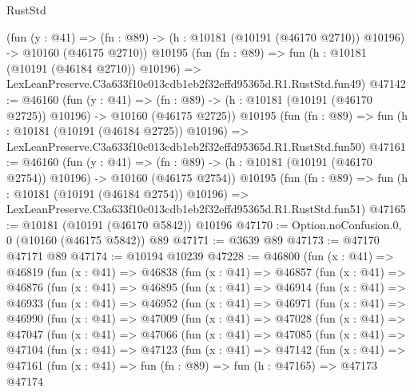 \begin{lexlean}{RustStd}
\begin{coremodule}
    (fun (y : @41) =>
    (fn : @89) -> (h : @10181 (@10191 (@46170 @2710)) @10196) -> @10160 (@46175 @2710))
    @10195
    (fun (fn : @89) =>
    fun (h : @10181 (@10191 (@46184 @2710)) @10196) =>
    LexLeanPreserve.C3a633f10c013cdb1eb2f32effd95365d.R1.RustStd.fun49)
@47142 := @46160
    (fun (y : @41) =>
    (fn : @89) -> (h : @10181 (@10191 (@46170 @2725)) @10196) -> @10160 (@46175 @2725))
    @10195
    (fun (fn : @89) =>
    fun (h : @10181 (@10191 (@46184 @2725)) @10196) =>
    LexLeanPreserve.C3a633f10c013cdb1eb2f32effd95365d.R1.RustStd.fun50)
@47161 := @46160
    (fun (y : @41) =>
    (fn : @89) -> (h : @10181 (@10191 (@46170 @2754)) @10196) -> @10160 (@46175 @2754))
    @10195
    (fun (fn : @89) =>
    fun (h : @10181 (@10191 (@46184 @2754)) @10196) =>
    LexLeanPreserve.C3a633f10c013cdb1eb2f32effd95365d.R1.RustStd.fun51)
@47165 := @10181 (@10191 (@46170 @5842)) @10196
@47170 := Option.noConfusion.{0, 0} (@10160 (@46175 @5842)) @89
@47171 := @3639 @89
@47173 := @47170 @47171 @89
@47174 := @10194 @10239
@47228 := @46800
    (fun (x : @41) =>
    @46819
      (fun (x : @41) =>
      @46838
        (fun (x : @41) =>
        @46857
          (fun (x : @41) =>
          @46876
            (fun (x : @41) =>
            @46895
              (fun (x : @41) =>
              @46914
                (fun (x : @41) =>
                @46933
                  (fun (x : @41) =>
                  @46952
                    (fun (x : @41) =>
                    @46971
                      (fun (x : @41) =>
                      @46990
                        (fun (x : @41) =>
                        @47009
                          (fun (x : @41) =>
                          @47028
                            (fun (x : @41) =>
                            @47047
                              (fun (x : @41) =>
                              @47066
                                (fun (x : @41) =>
                                @47085
                                  (fun (x : @41) =>
                                  @47104
                                    (fun (x : @41) =>
                                    @47123
                                      (fun (x : @41) =>
                                      @47142
                                        (fun (x : @41) =>
                                        @47161
                                          (fun (x : @41) =>
                                          fun (fn : @89) =>
                                          fun (h : @47165) =>
                                          @47173
                                            @47174

\end{coremodule}
\end{lexlean}
